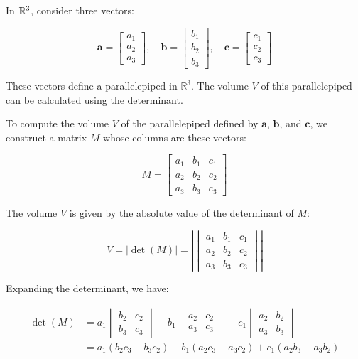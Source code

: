 \documentclass[12pt,a4paper]{article}
\begin{document}
In $\mathbb{R}^3$, consider three vectors:

\[
\mathbf{a} = \begin{bmatrix} a_1 \\ a_2 \\ a_3 \end{bmatrix}, \quad
\mathbf{b} = \begin{bmatrix} b_1 \\ b_2 \\ b_3 \end{bmatrix}, \quad
\mathbf{c} = \begin{bmatrix} c_1 \\ c_2 \\ c_3 \end{bmatrix}
\]

These vectors define a parallelepiped in \(\mathbb{R}^3\). The volume \(V\) of this parallelepiped can be calculated using the determinant.

To compute the volume \(V\) of the parallelepiped defined by \(\mathbf{a}\), \(\mathbf{b}\), and \(\mathbf{c}\), we construct a matrix \(M\) whose columns are these vectors:

\[
M = \begin{bmatrix}
a_1 & b_1 & c_1 \\
a_2 & b_2 & c_2 \\
a_3 & b_3 & c_3
\end{bmatrix}
\]

The volume \(V\) is given by the absolute value of the determinant of \(M\):

\[
V = \left| \det(M) \right| = \left| \begin{vmatrix}
a_1 & b_1 & c_1 \\
a_2 & b_2 & c_2 \\
a_3 & b_3 & c_3
\end{vmatrix} \right|
\]

Expanding the determinant, we have:

\begin{align*}
\det(M) &= a_1 \begin{vmatrix} b_2 & c_2 \\ b_3 & c_3 \end{vmatrix} - b_1 \begin{vmatrix} a_2 & c_2 \\ a_3 & c_3 \end{vmatrix} + c_1 \begin{vmatrix} a_2 & b_2 \\ a_3 & b_3 \end{vmatrix} \\
&= a_1 (b_2 c_3 - b_3 c_2) - b_1 (a_2 c_3 - a_3 c_2) + c_1 (a_2 b_3 - a_3 b_2)
\end{align*}
\end{document}
